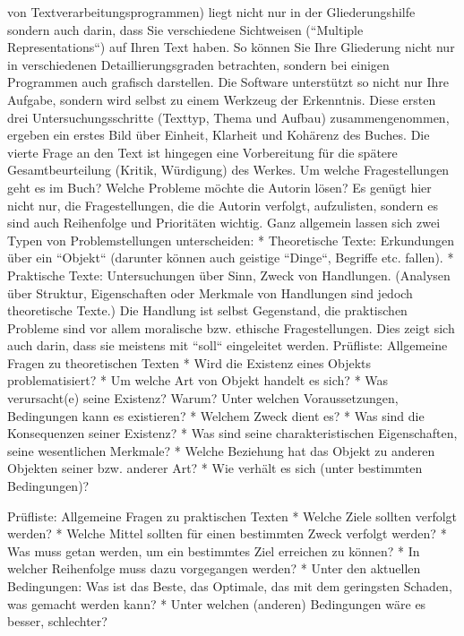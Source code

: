 \documentclass[]{book}
\theoremstyle{definition}
\theoremstyle{definition}
\theoremstyle{definition}
\theoremstyle{remark}
\begin{document}
von Textverarbeitungsprogrammen) liegt nicht nur in der Gliederungshilfe
sondern auch darin, dass Sie verschiedene Sichtweisen (``Multiple
Representations``) auf Ihren Text haben. So können Sie Ihre Gliederung
nicht nur in verschiedenen Detaillierungsgraden betrachten, sondern bei
einigen Programmen auch grafisch darstellen. Die Software unterstützt so
nicht nur Ihre Aufgabe, sondern wird selbst zu einem Werkzeug der
Erkenntnis. Diese ersten drei Untersuchungsschritte (Texttyp, Thema und
Aufbau) zusammengenommen, ergeben ein erstes Bild über Einheit, Klarheit
und Kohärenz des Buches. Die vierte Frage an den Text ist hingegen eine
Vorbereitung für die spätere Gesamtbeurteilung (Kritik, Würdigung) des
Werkes. Um welche Fragestellungen geht es im Buch? Welche Probleme
möchte die Autorin lösen? Es genügt hier nicht nur, die Fragestellungen,
die die Autorin verfolgt, aufzulisten, sondern es sind auch Reihenfolge
und Prioritäten wichtig. Ganz allgemein lassen sich zwei Typen von
Problemstellungen unterscheiden: * Theoretische Texte: Erkundungen über
ein ``Objekt`` (darunter können auch geistige ``Dinge``, Begriffe etc.
fallen). * Praktische Texte: Untersuchungen über Sinn, Zweck von
Handlungen. (Analysen über Struktur, Eigenschaften oder Merkmale von
Handlungen sind jedoch theoretische Texte.) Die Handlung ist selbst
Gegenstand, die praktischen Probleme sind vor allem moralische bzw.
ethische Fragestellungen. Dies zeigt sich auch darin, dass sie meistens
mit ``soll`` eingeleitet werden. Prüfliste: Allgemeine Fragen zu
theoretischen Texten * Wird die Existenz eines Objekts problematisiert?
* Um welche Art von Objekt handelt es sich? * Was verursacht(e) seine
Existenz? Warum? Unter welchen Voraussetzungen, Bedingungen kann es
existieren? * Welchem Zweck dient es? * Was sind die Konsequenzen seiner
Existenz? * Was sind seine charakteristischen Eigenschaften, seine
wesentlichen Merkmale? * Welche Beziehung hat das Objekt zu anderen
Objekten seiner bzw. anderer Art? * Wie verhält es sich (unter
bestimmten Bedingungen)?

Prüfliste: Allgemeine Fragen zu praktischen Texten * Welche Ziele
sollten verfolgt werden? * Welche Mittel sollten für einen bestimmten
Zweck verfolgt werden? * Was muss getan werden, um ein bestimmtes Ziel
erreichen zu können? * In welcher Reihenfolge muss dazu vorgegangen
werden? * Unter den aktuellen Bedingungen: Was ist das Beste, das
Optimale, das mit dem geringsten Schaden, was gemacht werden kann? *
Unter welchen (anderen) Bedingungen wäre es besser, schlechter?
\end{document}
